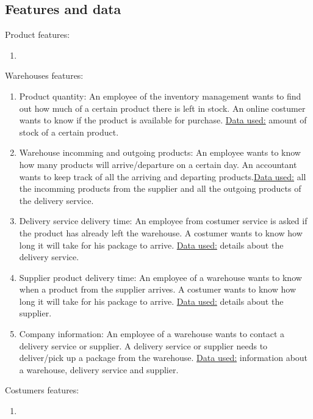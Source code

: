 \documentclass{article}
\begin{document}
\subsection{Features and data}

Product features:
\begin{enumerate}
  \item
\end{enumerate}

\noindent Warehouses features:
\begin{enumerate}
  \item Product quantity: An employee of the inventory management wants to find out how much of a certain product there is left in stock. An online costumer wants to know if the product is available for purchase.
  \underline{Data used:} amount of stock of a certain product.
  \item Warehouse incomming and outgoing products: An employee wants to know how many products will arrive/departure on a certain day. An accountant wants to keep track of all the arriving and departing products.\underline{Data used:} all the incomming products from the supplier and all the outgoing products of the delivery service.
  \item Delivery service delivery time: An employee from costumer service is asked if the product has already left the warehouse. A costumer wants to know how long it will take for his package to arrive.
  \underline{Data used:} details about the delivery service.
  \item Supplier product delivery time: An employee of a warehouse wants to know when a product from the supplier arrives. A costumer wants to know how long it will take for his package to arrive.
  \underline{Data used:} details about the supplier.
  \item Company information: An employee of a warehouse wants to contact a delivery service or supplier. A delivery service or supplier needs to deliver/pick up a package from the warehouse.
  \underline{Data used:} information about a warehouse, delivery service and supplier.
\end{enumerate}

\noindent Costumers features:
\begin{enumerate}
  \item
\end{enumerate}
\end{document}
